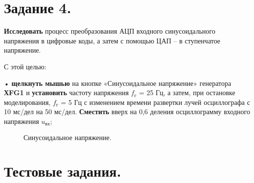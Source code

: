 \documentclass[spec, och, otchet, hidelinks]{SCWorks}
\begin{document}
\newpage

\section*{Задание 4.}

\textbf{Исследовать} процесс преобразования АЦП входного синусоидального напряжения в цифровые коды, а затем с помощью ЦАП – в ступенчатое напряжение.

\par С этой целью:

• \textbf{щелкнуть мышью} на кнопке «Синусоидальное напряжение» генератора \textbf{ХFG1} и \textbf{установить} частоту напряжения $f_\text{г}$ = 25 Гц, 
а затем, при остановке моделирования, $f_\text{г}$ = 5 Гц с изменением времени развертки лучей осциллографа с 10 мс/дел на 50 мс/дел. \textbf{Сместить} 
вверх на 0,6 деления осциллограмму входного напряжения $u_\text{вх}$;

\begin{figure}[h]
	\caption{Синусоидальное напряжение.}
\end{figure}

\newpage

\section*{Тестовые задания.}
\end{document}
